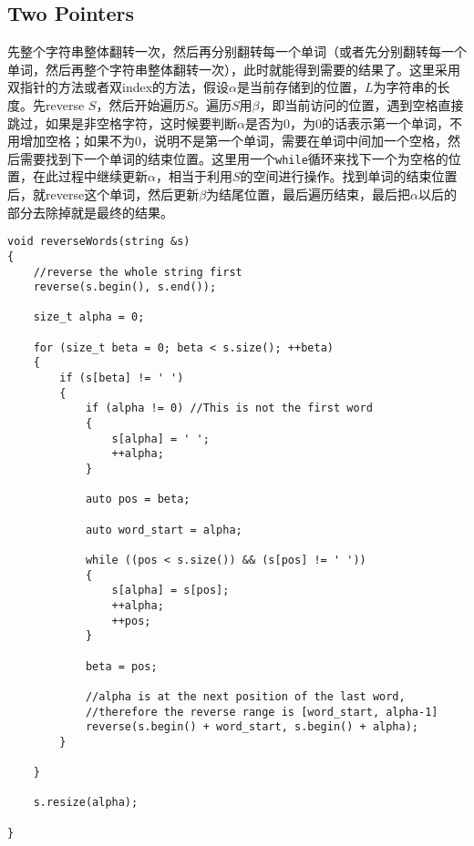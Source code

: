 \subsection{Two Pointers}
\begin{CJK*}{UTF8}{gbsn}
先整个字符串整体翻转一次，然后再分别翻转每一个单词（或者先分别翻转每一个单词，然后再整个字符串整体翻转一次），此时就能得到需要的结果了。这里采用双指针的方法或者双index的方法，假设$\alpha$是当前存储到的位置，$L$为字符串的长度。先reverse $S$，然后开始遍历$S$。遍历$S$用$\beta$，即当前访问的位置，遇到空格直接跳过，如果是非空格字符，这时候要判断$\alpha$是否为0，为0的话表示第一个单词，不用增加空格；如果不为0，说明不是第一个单词，需要在单词中间加一个空格，然后需要找到下一个单词的结束位置。这里用一个\texttt{while}循环来找下一个为空格的位置，在此过程中继续更新$\alpha$，相当于利用$S$的空间进行操作。找到单词的结束位置后，就reverse这个单词，然后更新$\beta$为结尾位置，最后遍历结束，最后把$\alpha$以后的部分去除掉就是最终的结果。
\end{CJK*}
\setcounter{lstlisting}{0}
\begin{lstlisting}[style=customc, caption={Two Pointers}]
void reverseWords(string &s)
{
	//reverse the whole string first
	reverse(s.begin(), s.end());

	size_t alpha = 0;

	for (size_t beta = 0; beta < s.size(); ++beta)
	{
		if (s[beta] != ' ')
		{
			if (alpha != 0) //This is not the first word
			{
				s[alpha] = ' ';
				++alpha;
			}

			auto pos = beta;

			auto word_start = alpha;

			while ((pos < s.size()) && (s[pos] != ' '))
			{
				s[alpha] = s[pos];
				++alpha;
				++pos;
			}

			beta = pos;

			//alpha is at the next position of the last word,
			//therefore the reverse range is [word_start, alpha-1]
			reverse(s.begin() + word_start, s.begin() + alpha);
		}

	}

	s.resize(alpha);

}
\end{lstlisting}
